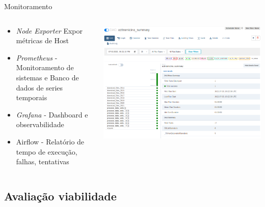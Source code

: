 \documentclass[10pt,brazil]{beamer}
\theoremstyle{definition}
\begin{document}
\begin{frame}{Monitoramento}
    \begin{columns}
      \begin{column}{0.5\textwidth}
  \begin{itemize}
    \item \emph{Node Exporter} Expor métricas de Host
    \item \emph{Prometheus} -  Monitoramento de sistemas e Banco de dados de series temporais
    \item \emph{Grafana} - Dashboard e observabilidade
    \item Airflow - Relatório de tempo de execução, falhas, tentativas
  \end{itemize}
\end{column}
\begin{column}{0.5\textwidth}
  \begin{center}
    \includegraphics[width=1\textwidth]{report_execution_summary.png}
  \end{center}
\end{column}
\end{columns}
\end{frame}


\subsection{Avaliação viabilidade}
\end{document}
